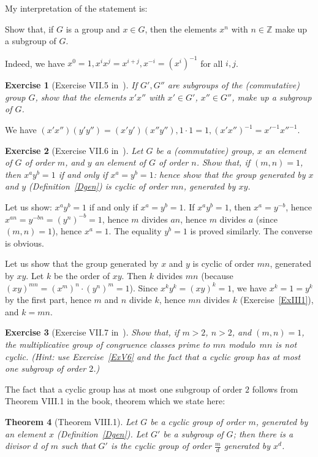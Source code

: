 \documentclass[12pt,letterpaper]{article}
\newcommand{\Z}{\mathbb{Z}}
\newtheorem{thm}{Theorem}%
\newtheorem{exer}[thm]{Exercise}
\theoremstyle{definition}
\begin{document}
My interpretation of the statement is: 

Show that, if $G$ is a group and $x\in G$, then the elements $x^n$ with $n\in\Z$ make up a subgroup of $G$. 

Indeed, we have $x^0=1, x^ix^j=x^{i+j}, x^{-i}=(x^i)^{-1}$ for all $i, j$. 

\begin{exer}[Exercise VII.5 in~\cite{weil1979}]
If $G',G''$ are subgroups of the (commutative) group $G$, show that the elements $x'x''$ with $x'\in G'$, $x''\in G''$, make up a subgroup of $G$.
\end{exer}

We have $(x'x'')(y'y'')=(x'y')(x''y''), 1\cdot1=1, (x'x'')^{-1}=x'^{-1}x''^{-1}$. 

\begin{exer}[Exercise VII.6 in~\cite{weil1979}]
Let $G$ be a (commutative) group, $x$ an element of $G$ of order $m$, and $y$ an element of $G$ of order $n$. Show that, if $(m,n)=1$, then $x^ay^b=1$ if and only if $x^a=y^b=1$: hence show that the group generated by $x$ and $y$ (Definition~\ref{Dgen}) is cyclic of order $mn$, generated by $xy$.
\end{exer}

Let us show: $x^ay^b=1$ if and only if $x^a=y^b=1$. If $x^ay^b=1$, then $x^a=y^{-b}$, hence $x^{an}=y^{-bn}=(y^n)^{-b}=1$, hence $m$ divides $an$, hence $m$ divides $a$ (since $(m,n)=1$), hence $x^a=1$. The equality $y^b=1$ is proved similarly. The converse is obvious. 

Let us show that the group generated by $x$ and $y$ is cyclic of order $mn$, generated by $xy$. Let $k$ be the order of $xy$. Then $k$ divides $mn$ (because $(xy)^{mn}=(x^m)^n\cdot(y^n)^m=1$). Since $x^ky^k=(xy)^k=1$, we have $x^k=1=y^k$ by the first part, hence $m$ and $n$ divide $k$, hence $mn$ divides $k$ (Exercise~\ref{ExIII1}), and $k=mn$. 

\begin{exer}[Exercise VII.7 in~\cite{weil1979}]\label{ExVII7}
Show that, if $m>2$, $n>2$, and $(m,n)=1$, the multiplicative group of congruence classes prime to $mn$ modulo~$mn$ is not cyclic. (Hint: use Exercise~\ref{ExV6} and the fact that a cyclic group has at most one subgroup of order $2$.)
\end{exer}

The fact that a cyclic group has at most one subgroup of order $2$ follows from Theorem VIII.1 in the book, theorem which we state here: 

\begin{thm}[Theorem VIII.1] 
Let $G$ be a cyclic group of order $m$, generated by an element $x$ (Definition~\ref{Dgen}). Let $G'$ be a subgroup of $G$; then there is a divisor $d$ of $m$ such that $G'$ is the cyclic group of order $\frac{m}{d}$ generated by $x^d$. 
\end{thm}
\end{document}
